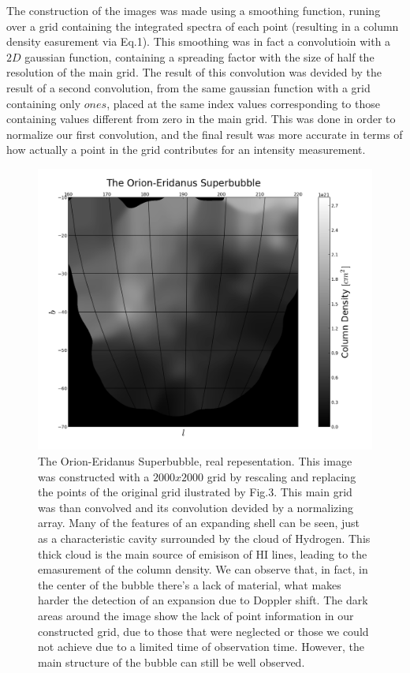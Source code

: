 \documentclass{article}
\begin{document}
The construction of the images was made using a smoothing function, runing over a grid containing the integrated spectra of each point (resulting in a column density easurement via Eq.1). 
This smoothing was in fact a convolutioin with a $2D$ gaussian function, containing a spreading factor with the size of half the resolution of the main grid. The result of this convolution was devided by the result
of a second convolution, from the same gaussian function with a grid containing only $ones$, placed at the same index values corresponding to those containing values different from zero in the main grid.
This was done in order to normalize our first convolution, and the final 
result was more accurate in terms of how actually a point in the grid contributes for 
an intensity measurement.

\begin{figure}[H]
\center
\includegraphics[scale=0.52]{final_orion_comprs.png}
\caption {The Orion-Eridanus Superbubble, real repesentation. 
This image was constructed with a 
$2000x2000$ grid by rescaling and replacing the points of the original grid
ilustrated by Fig.3. This main grid was than convolved and its convolution devided
by a normalizing array. Many of the features of an expanding shell can be seen,
just as a characteristic cavity surrounded by the cloud of Hydrogen. This thick
cloud is the main source of emisison of HI lines, leading to the emasurement of
the column density. We can observe that, in fact, in the center of the bubble there's a lack 
of material, what makes harder the detection of an expansion due to Doppler shift. The
dark areas around the image show the lack of point information in our constructed grid,
due to those that were neglected or those we could not achieve due to a limited time of
observation time. However, the main structure of the bubble can still be well observed.} 
\label{m17}
\end{figure}
\end{document}
